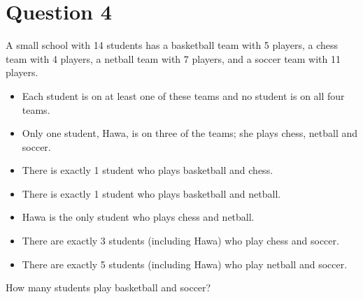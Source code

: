 \documentclass[11pt]{article}
\begin{document}
\section*{Question 4}

A small school with 14 students has a basketball team with 5 players, a chess
team with 4 players, a netball team with 7 players, and a soccer team with 11
players.

\begin{itemize}
  \item Each student is on at least one of these teams and no student is on all
    four teams.
  \item Only one student, Hawa, is on three of the teams; she plays chess,
    netball and soccer.
  \item There is exactly 1 student who plays basketball and chess.
  \item There is exactly 1 student who plays basketball and netball.
  \item Hawa is the only student who plays chess and netball.
  \item There are exactly 3 students (including Hawa) who play chess and soccer.
  \item There are exactly 5 students (including Hawa) who play netball and
    soccer.
\end{itemize}

How many students play basketball and soccer?
\end{document}
